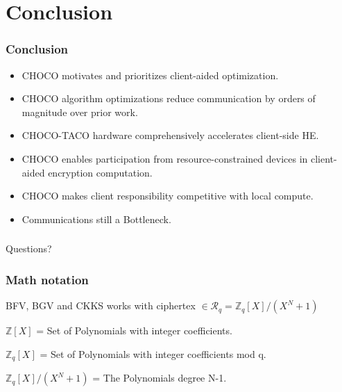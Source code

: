 \documentclass[10pt,handout]{beamer}
\begin{document}
\section{Conclusion}
\begin{frame}
\frametitle{Conclusion}
\begin{itemize}
    \item CHOCO motivates and prioritizes client-aided optimization.
    \item CHOCO algorithm optimizations reduce communication by orders of magnitude over prior work.
\pause
    \item CHOCO-TACO hardware comprehensively accelerates client-side HE.
    \item CHOCO enables participation from resource-constrained devices in client-aided encryption computation.
\pause
    \item CHOCO makes client responsibility competitive with local compute.
    \item Communications still a Bottleneck.
\end{itemize}

\end{frame}


\begin{frame}
\frametitle{}
\Huge

\begin{center}
   Questions?
\end{center}
\end{frame}




\begin{frame}[noframenumbering]
\frametitle{Math notation}
BFV, BGV and CKKS works with ciphertex  $\in \mathcal{R}_q =\mathbb{Z}_q[X]/(X^N+1)$

$\mathbb{Z}[X]$ = Set of Polynomials with integer coefficients.

$\mathbb{Z}_q[X]$ = Set of Polynomials with integer coefficients mod q.

$\mathbb{Z}_q[X]/(X^N+1)$ = The Polynomials degree N-1.


\end{frame}
\end{document}
